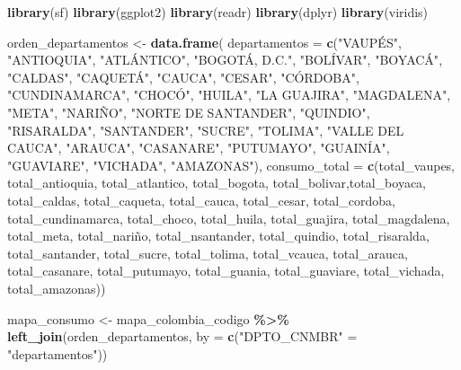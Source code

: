 \documentclass[
]{article}
\newenvironment{Shaded}{\begin{snugshade}}{\end{snugshade}}
\newcommand{\AttributeTok}[1]{\textcolor[rgb]{0.13,0.29,0.53}{#1}}
\newcommand{\FunctionTok}[1]{\textcolor[rgb]{0.13,0.29,0.53}{\textbf{#1}}}
\newcommand{\NormalTok}[1]{#1}
\newcommand{\OtherTok}[1]{\textcolor[rgb]{0.56,0.35,0.01}{#1}}
\newcommand{\SpecialCharTok}[1]{\textcolor[rgb]{0.81,0.36,0.00}{\textbf{#1}}}
\newcommand{\StringTok}[1]{\textcolor[rgb]{0.31,0.60,0.02}{#1}}
\begin{document}
\begin{Shaded}
\begin{Highlighting}[]
\FunctionTok{library}\NormalTok{(sf)}
\FunctionTok{library}\NormalTok{(ggplot2)}
\FunctionTok{library}\NormalTok{(readr)}
\FunctionTok{library}\NormalTok{(dplyr)}
\FunctionTok{library}\NormalTok{(viridis)}

\NormalTok{orden\_departamentos }\OtherTok{\textless{}{-}} \FunctionTok{data.frame}\NormalTok{(}
  \AttributeTok{departamentos =} \FunctionTok{c}\NormalTok{(}\StringTok{"VAUPÉS"}\NormalTok{, }\StringTok{"ANTIOQUIA"}\NormalTok{, }\StringTok{"ATLÁNTICO"}\NormalTok{, }\StringTok{"BOGOTÁ, D.C."}\NormalTok{, }\StringTok{"BOLÍVAR"}\NormalTok{, }\StringTok{"BOYACÁ"}\NormalTok{, }\StringTok{"CALDAS"}\NormalTok{, }\StringTok{"CAQUETÁ"}\NormalTok{, }\StringTok{"CAUCA"}\NormalTok{, }\StringTok{"CESAR"}\NormalTok{, }\StringTok{"CÓRDOBA"}\NormalTok{, }\StringTok{"CUNDINAMARCA"}\NormalTok{, }\StringTok{"CHOCÓ"}\NormalTok{, }\StringTok{"HUILA"}\NormalTok{, }\StringTok{"LA GUAJIRA"}\NormalTok{, }\StringTok{"MAGDALENA"}\NormalTok{, }\StringTok{"META"}\NormalTok{, }\StringTok{"NARIÑO"}\NormalTok{, }\StringTok{"NORTE DE SANTANDER"}\NormalTok{, }\StringTok{"QUINDIO"}\NormalTok{, }\StringTok{"RISARALDA"}\NormalTok{, }\StringTok{"SANTANDER"}\NormalTok{, }\StringTok{"SUCRE"}\NormalTok{, }\StringTok{"TOLIMA"}\NormalTok{, }\StringTok{"VALLE DEL CAUCA"}\NormalTok{, }\StringTok{"ARAUCA"}\NormalTok{, }\StringTok{"CASANARE"}\NormalTok{, }\StringTok{"PUTUMAYO"}\NormalTok{, }\StringTok{"GUAINÍA"}\NormalTok{, }\StringTok{"GUAVIARE"}\NormalTok{, }\StringTok{"VICHADA"}\NormalTok{, }\StringTok{"AMAZONAS"}\NormalTok{),}
  \AttributeTok{consumo\_total =} \FunctionTok{c}\NormalTok{(total\_vaupes, total\_antioquia, total\_atlantico, total\_bogota, total\_bolivar,total\_boyaca, total\_caldas, total\_caqueta, total\_cauca, total\_cesar, total\_cordoba, total\_cundinamarca, total\_choco, total\_huila, total\_guajira, total\_magdalena, total\_meta, total\_nariño, total\_nsantander, total\_quindio, total\_risaralda, total\_santander, total\_sucre, total\_tolima, total\_vcauca, total\_arauca, total\_casanare, total\_putumayo, total\_guania, total\_guaviare, total\_vichada, total\_amazonas))}

\NormalTok{mapa\_consumo }\OtherTok{\textless{}{-}}\NormalTok{ mapa\_colombia\_codigo }\SpecialCharTok{\%\textgreater{}\%}
  \FunctionTok{left\_join}\NormalTok{(orden\_departamentos, }\AttributeTok{by =} \FunctionTok{c}\NormalTok{(}\StringTok{"DPTO\_CNMBR"} \OtherTok{=} \StringTok{"departamentos"}\NormalTok{)) }


\end{Highlighting}
\end{Shaded}
\end{document}
